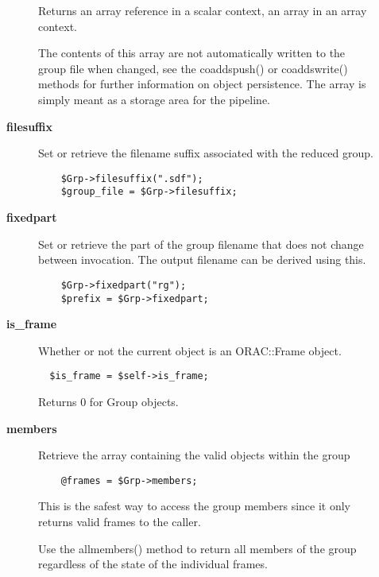 \begin{description}
\begin{description}
Returns an array reference in a scalar context, an array in an
array context.



The contents of this array are not automatically written to the
group file when changed, see the coaddspush() or coaddswrite() methods
for further information on object persistence. The array is simply
meant as a storage area for the pipeline.


\item[{\textbf{filesuffix}}] \mbox{}

Set or retrieve the filename suffix associated with the
reduced group.

\begin{verbatim}
    $Grp->filesuffix(".sdf");
    $group_file = $Grp->filesuffix;
\end{verbatim}

\item[{\textbf{fixedpart}}] \mbox{}

Set or retrieve the part of the group filename that does not
change between invocation. The output filename can be derived using
this.

\begin{verbatim}
    $Grp->fixedpart("rg");
    $prefix = $Grp->fixedpart;
\end{verbatim}

\item[{\textbf{is\_frame}}] \mbox{}

Whether or not the current object is an ORAC::Frame object.

\begin{verbatim}
  $is_frame = $self->is_frame;
\end{verbatim}


Returns 0 for Group objects.


\item[{\textbf{members}}] \mbox{}

Retrieve the array containing the valid objects within the group

\begin{verbatim}
    @frames = $Grp->members;
\end{verbatim}


This is the safest way to access the group members
since it only returns valid frames to the caller.



Use the allmembers() method to return all members of the group
regardless of the state of the individual frames.




\end{description}
\end{description}
